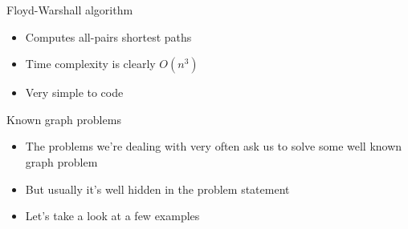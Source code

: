 \documentclass[10pt]{beamer}
\newcommand{\bi}{\begin{itemize}}
\newcommand{\ei}{\end{itemize}}
\begin{document}
\begin{frame}{Floyd-Warshall algorithm}
    \bi
\item Computes all-pairs shortest paths
\item Time complexity is clearly $O(n^3)$
\item Very simple to code
    \ei
\end{frame}

% 

\begin{frame}{Known graph problems}
    \bi
        \item The problems we're dealing with very often ask us to solve some well known graph problem
        \item But usually it's well hidden in the problem statement
        \vspace{10pt}
        \item Let's take a look at a few examples
    \ei
\end{frame}
\end{document}
